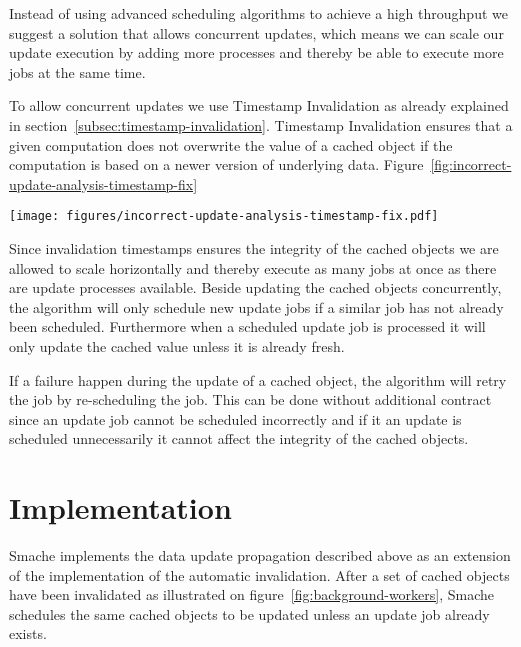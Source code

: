 Instead of using advanced scheduling algorithms to achieve a high throughput we suggest a solution that allows concurrent updates, which means we can scale our update execution by adding more processes and thereby be able to execute more jobs at the same time.

To allow concurrent updates we use Timestamp Invalidation as already explained in section~\ref{subsec:timestamp-invalidation}. Timestamp Invalidation ensures that a given computation does not overwrite the value of a cached object if the computation is based on a newer version of underlying data. Figure~\ref{fig:incorrect-update-analysis-timestamp-fix}

\begin{figure*}[ht!]
  \centering
  \texttt{[image: figures/incorrect-update-analysis-timestamp-fix.pdf]}
  \caption{How Invalidation Timestamps fixes the concurrency problem described in figure~\ref{fig:incorrect-updates-analysis}.}
  \label{fig:incorrect-update-analysis-timestamp-fix}
\end{figure*}

Since invalidation timestamps ensures the integrity of the cached objects we are allowed to scale horizontally and thereby execute as many jobs at once as there are update processes available. Beside updating the cached objects concurrently, the algorithm will only schedule new update jobs if a similar job has not already been scheduled. Furthermore when a scheduled update job is processed it will only update the cached value unless it is already fresh.

If a failure happen during the update of a cached object, the algorithm will retry the job by re-scheduling the job. This can be done without additional contract since an update job cannot be scheduled incorrectly and if it an update is scheduled unnecessarily it cannot affect the integrity of the cached objects.


\section{Implementation}
\label{sec:implementing-the-data-updata-propagation-algorithm}

Smache implements the data update propagation described above as an extension of the implementation of the automatic invalidation. After a set of cached objects have been invalidated as illustrated on figure~\ref{fig:background-workers}, Smache schedules the same cached objects to be updated unless an update job already exists.

